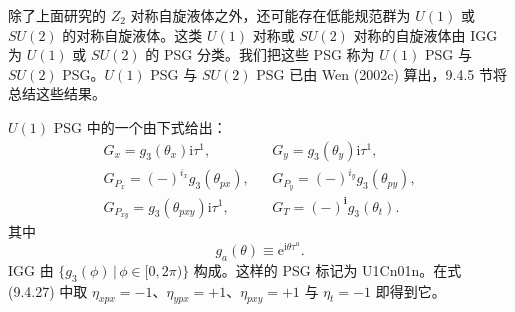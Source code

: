 除了上面研究的 $Z_{2}$ 对称自旋液体之外，还可能存在低能规范群为 $U(1)$ 或 $SU(2)$ 的对称自旋液体。这类 $U(1)$ 对称或 $SU(2)$ 对称的自旋液体由 IGG 为 $U(1)$ 或 $SU(2)$ 的 PSG 分类。我们把这些 PSG 称为 $U(1)$ PSG 与 $SU(2)$ PSG。$U(1)$ PSG 与 $SU(2)$ PSG 已由 Wen (2002c) 算出，9.4.5 节将总结这些结果。

$U(1)$ PSG 中的一个由下式给出：
\begin{equation*}
\begin{array}{rcl}
G_{x}=g_{3}(\theta_{x})\mathrm{i}\tau^{1}, & & G_{y}=g_{3}(\theta_{y})\mathrm{i}\tau^{1},\\[2pt]
G_{P_{x}}=(-)^{i_{x}}g_{3}(\theta_{px}), & & G_{P_{y}}=(-)^{i_{y}}g_{3}(\theta_{py}),\\[2pt]
G_{P_{xy}}=g_{3}(\theta_{pxy})\mathrm{i}\tau^{1}, & & G_{T}=(-)^{\pmb{i}}g_{3}(\theta_{t}).
\end{array}
\tag{9.4.19}
\end{equation*}
其中
\begin{equation*}
g_{a}(\theta)\equiv\mathrm{e}^{\mathrm{i}\theta\tau^{a}}.
\end{equation*}
IGG 由 $\{g_{3}(\phi)\,|\,\phi\in[0,2\pi)\}$ 构成。这样的 PSG 标记为 U1Cn01n。在式 (9.4.27) 中取 $\eta_{xpx}=-1$、$\eta_{ypx}=+1$、$\eta_{pxy}=+1$ 与 $\eta_{t}=-1$ 即得到它。

